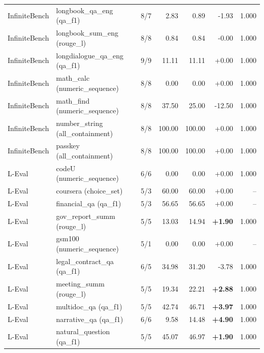 \begin{longtable}{lp{3.1cm}rrrrr}
InfiniteBench & \raggedright longbook\_\allowbreak qa\_\allowbreak eng {\tiny (qa\_f1)} & 8/7 & 2.83 & 0.89 & -1.93 & 1.000 \\
InfiniteBench & \raggedright longbook\_\allowbreak sum\_\allowbreak eng {\tiny (rouge\_l)} & 8/8 & 0.84 & 0.84 & -0.00 & 1.000 \\
InfiniteBench & \raggedright longdialogue\_\allowbreak qa\_\allowbreak eng {\tiny (qa\_f1)} & 9/9 & 11.11 & 11.11 & +0.00 & 1.000 \\
InfiniteBench & \raggedright math\_\allowbreak calc {\tiny (numeric\_sequence)} & 8/8 & 0.00 & 0.00 & +0.00 & 1.000 \\
InfiniteBench & \raggedright math\_\allowbreak find {\tiny (numeric\_sequence)} & 8/8 & 37.50 & 25.00 & -12.50 & 1.000 \\
InfiniteBench & \raggedright number\_\allowbreak string {\tiny (all\_containment)} & 8/8 & 100.00 & 100.00 & +0.00 & 1.000 \\
InfiniteBench & \raggedright passkey {\tiny (all\_containment)} & 8/8 & 100.00 & 100.00 & +0.00 & 1.000 \\
L-Eval & \raggedright codeU {\tiny (numeric\_sequence)} & 6/6 & 0.00 & 0.00 & +0.00 & 1.000 \\
L-Eval & \raggedright coursera {\tiny (choice\_set)} & 5/3 & 60.00 & 60.00 & +0.00 & -- \\
L-Eval & \raggedright financial\_\allowbreak qa {\tiny (qa\_f1)} & 5/3 & 56.65 & 56.65 & +0.00 & -- \\
L-Eval & \raggedright gov\_\allowbreak report\_\allowbreak summ {\tiny (rouge\_l)} & 5/5 & 13.03 & 14.94 & \textbf{+1.90} & 1.000 \\
L-Eval & \raggedright gsm100 {\tiny (numeric\_sequence)} & 5/1 & 0.00 & 0.00 & +0.00 & -- \\
L-Eval & \raggedright legal\_\allowbreak contract\_\allowbreak qa {\tiny (qa\_f1)} & 6/5 & 34.98 & 31.20 & -3.78 & 1.000 \\
L-Eval & \raggedright meeting\_\allowbreak summ {\tiny (rouge\_l)} & 5/5 & 19.34 & 22.21 & \textbf{+2.88} & 1.000 \\
L-Eval & \raggedright multidoc\_\allowbreak qa {\tiny (qa\_f1)} & 5/5 & 42.74 & 46.71 & \textbf{+3.97} & 1.000 \\
L-Eval & \raggedright narrative\_\allowbreak qa {\tiny (qa\_f1)} & 6/6 & 9.58 & 14.48 & \textbf{+4.90} & 1.000 \\
L-Eval & \raggedright natural\_\allowbreak question {\tiny (qa\_f1)} & 5/5 & 45.07 & 46.97 & \textbf{+1.90} & 1.000 \\

\end{longtable}

